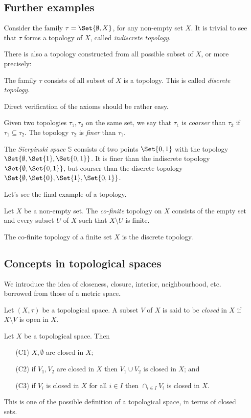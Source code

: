 \documentclass[main.tex]{subfiles}
\begin{document}
		\subsection{Further examples}
		\begin{example}
			Consider the family $\tau = \Set{\emptyset, X}$, for any non-empty set $X$. It is trivial to see that $\tau$ forms a topology of $X$, called \textit{indiscrete topology}.
		\end{example}
			There is also a topology constructed from all possible subset of $X$, or more precisely:
		\begin{example}
			The family $\tau$ consists of all subset of $X$ is a topology. This is called \textit{discrete topology}.
		\end{example}
		Direct verification of the axioms should be rather easy.
		\begin{definition}
			Given two topologies $\tau_1, \tau_2$ on the same set, we say that $\tau_1$ is \textit{coarser} than $\tau_2$ if $\tau_1 \subseteq \tau_2$. The topology $\tau_2$ is \textit{finer} than $\tau_1$.
		\end{definition}
		\begin{example}
			The \textit{Sierpinski space} $\mathbb{S}$ consists of two points $\Set{0, 1}$ with the topology $\Set{\emptyset, \Set{1}, \Set{0,1}}$. It is finer than the indiscrete topology $\Set{\emptyset, \Set{0, 1}}$, but courser than the discrete topology $\Set{\emptyset, \Set{0}, \Set{1}, \Set{0,1}}$.
		\end{example}
		Let's see the final example of a topology.
		\begin{example}
			Let $X$ be a non-empty set. The \textit{co-finite} topology on $X$ consists of the empty set and every subset $U$ of $X$ such that $X \setminus U$ is finite.
		\end{example}
		\begin{remark}
			The co-finite topology of a finite set $X$ is the discrete topology.
		\end{remark}
		\subsection{Concepts in topological spaces}
		We introduce the idea of closeness, closure, interior, neighbourhood, etc. borrowed from those of a metric space.
		\begin{definition}
			Let $(X, \tau)$ be a topological space. A subset $V$ of $X$ is said to be \textit{closed} in $X$ if $X\setminus V$ is open in $X$.
		\end{definition}
		\begin{theorem}
			Let $X$ be a topological space. Then
			\begin{itemize}
				\item [(C1)] $X, \emptyset$ are closed in $X$;
				\item [(C2)] if $V_1, V_2$ are closed in $X$ then $V_1 \cup V_2$ is closed in $X$; and
				\item [(C3)] if $V_i$ is closed in $X$ for all $i \in I$ then $\cap_{i \in I} V_i$ is closed in $X$.
			\end{itemize}
		\end{theorem}
		This is one of the possible definition of a topological space, in terms of closed sets.
\end{document}
